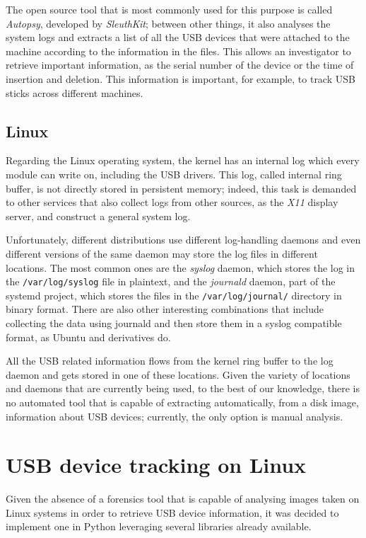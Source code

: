 \documentclass[a4paper]{article}
\begin{document}
The open source tool that is most commonly used for this purpose is called
\emph{Autopsy}, developed by \emph{SleuthKit}; between other things, it also
analyses the system logs and extracts a list of all the USB devices that were
attached to the machine according to the information in the files. This allows
an investigator to retrieve important information, as the serial number of the
device or the time of insertion and deletion. This information is important, for
example, to track USB sticks across different machines.~\cite{deb2015usb}

\subsection{Linux}
Regarding the Linux operating system, the kernel has an internal log which every
module can write on, including the USB drivers. This log, called internal ring
buffer, is not directly stored in persistent memory; indeed, this task is
demanded to other services that also collect logs from other sources, as the
\emph{X11} display server, and construct a general system log.

Unfortunately, different distributions use different log-handling daemons and
even different versions of the same daemon may store the log files in
different locations. The most common ones are the \emph{syslog} daemon, which
stores the log in the \texttt{/var/log/syslog} file in plaintext, and the
\emph{journald} daemon, part of the systemd project, which stores the files in
the \texttt{/var/log/journal/} directory in binary format. There are also other
interesting combinations that include collecting the data using journald and
then store them in a syslog compatible format, as Ubuntu and derivatives
do.~\cite{poettering2012journal}

All the USB related information flows from the kernel ring buffer to the log
daemon and gets stored in one of these locations. Given the variety of locations
and daemons that are currently being used, to the best of our knowledge, there
is no automated tool that is capable of extracting automatically, from a disk
image, information about USB devices; currently, the only option is manual
analysis.

\section{USB device tracking on Linux}
\label{sec:contrib}
Given the absence of a forensics tool that is capable of analysing images taken
on Linux systems in order to retrieve USB device information, it was decided to
implement one in Python leveraging several libraries already available.
\end{document}
